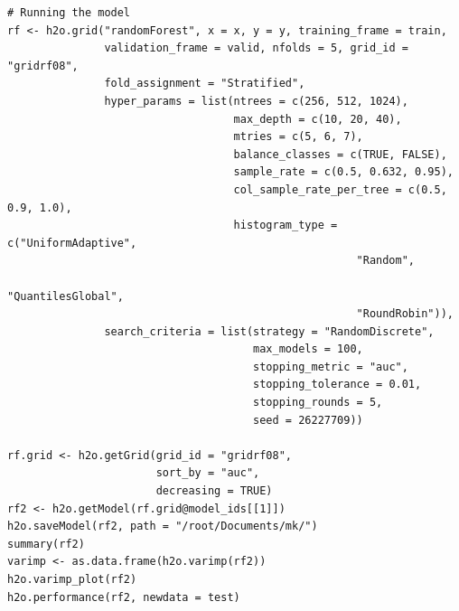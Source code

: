 \documentclass[a4paper,12pt]{article}
\begin{document}
\begin{verbatim}
# Running the model
rf <- h2o.grid("randomForest", x = x, y = y, training_frame = train, 
               validation_frame = valid, nfolds = 5, grid_id = "gridrf08",
               fold_assignment = "Stratified",
               hyper_params = list(ntrees = c(256, 512, 1024),
                                   max_depth = c(10, 20, 40),
                                   mtries = c(5, 6, 7),
                                   balance_classes = c(TRUE, FALSE),
                                   sample_rate = c(0.5, 0.632, 0.95),
                                   col_sample_rate_per_tree = c(0.5, 0.9, 1.0),
                                   histogram_type = c("UniformAdaptive",
                                                      "Random",
                                                      "QuantilesGlobal",
                                                      "RoundRobin")),
               search_criteria = list(strategy = "RandomDiscrete", 
                                      max_models = 100, 
                                      stopping_metric = "auc", 
                                      stopping_tolerance = 0.01, 
                                      stopping_rounds = 5, 
                                      seed = 26227709)) 

rf.grid <- h2o.getGrid(grid_id = "gridrf08",
                       sort_by = "auc",
                       decreasing = TRUE)
rf2 <- h2o.getModel(rf.grid@model_ids[[1]])
h2o.saveModel(rf2, path = "/root/Documents/mk/")
summary(rf2)
varimp <- as.data.frame(h2o.varimp(rf2))
h2o.varimp_plot(rf2)
h2o.performance(rf2, newdata = test)
     
\end{verbatim}

\newpage	


\end{document}
